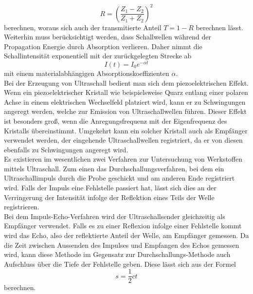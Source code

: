 \begin{equation}
R=(\frac{Z_1-Z_2}{Z_1+Z_2})^2
\end{equation}
berechnen, woraus sich auch der transmitierte Anteil $T=1-R$ berechnen lässt.
Weiterhin muss berücksichtigt werden, dass Schallwellen während der Propagation Energie durch Absorption verlieren. Daher nimmt die Schallintensität exponentiell mit der zurückgelegten Strecke ab
\begin{equation}
I(t)=I_0e^{-\alpha t}
\end{equation}
mit einem materialabhängigen Absorptionskoeffizienten $\alpha$. \\
Bei der Erzeugung von Ultraschall bedient man sich dem piezoelektrischen Effekt. Wenn ein piezoelektrischer Kristall wie beispielsweise Quarz entlang einer polaren Achse in einem elektrischen Wechselfeld platziert wird, kann er zu Schwingungen angeregt werden, welche zur Emission von Ultraschallwellen führen. Dieser Effekt ist besonders groß, wenn die Anregungsfrequenz mit der Eigenfrequenz des Kristalls übereinstimmt. Umgekehrt kann ein solcher Kristall auch als Empfänger verwendet werden, der eingehende Ultraschallwellen registriert, da er von diesen ebenfalls zu Schwingungen angeregt wird. \\
Es existieren im wesentlichen zwei Verfahren zur Untersuchung von Werkstoffen mittels Ultraschall. Zum einen das Durchschallungsverfahren, bei dem ein Ultraschallimpuls durch die Probe geschickt und am anderen Ende registriert wird. Falls der Impuls eine Fehlstelle passiert hat, lässt sich dies an der Verringerung der Intensität infolge der Reflektion eines Teils der Welle registrieren. \\
Bei dem Impuls-Echo-Verfahren wird der Ultraschallsender gleichzeitig als Empfänger verwendet. Falls es zu einer Reflexion infolge einer Fehlstelle kommt wird das Echo, also der reflektierte Anteil der Welle, am Empfänger gemessen. Da die Zeit zwischen Aussenden des Impulses und Empfangen des Echos gemessen wird, kann diese Methode im Gegensatz zur Durchschallungs-Methode auch Aufschluss über die Tiefe der Fehlstelle geben. Diese lässt sich aus der Formel
\begin{equation}
s=\frac{1}{2}ct
\end{equation}
berechnen.
